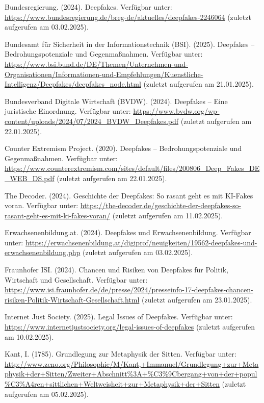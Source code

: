 \documentclass[a4paper,12pt]{article}
\begin{document}
\begin{thebibliography}{99}
 Bundesregierung. (2024). Deepfakes. 
Verfügbar unter: \url{https://www.bundesregierung.de/breg-de/aktuelles/deepfakes-2246064} (zuletzt aufgerufen am 03.02.2025).

 Bundesamt für Sicherheit in der Informationstechnik (BSI). (2025). Deepfakes – Bedrohungspotenziale und Gegenmaßnahmen. 
Verfügbar unter: \url{https://www.bsi.bund.de/DE/Themen/Unternehmen-und-Organisationen/Informationen-und-Empfehlungen/Kuenstliche-Intelligenz/Deepfakes/deepfakes_node.html} (zuletzt aufgerufen am 21.01.2025).

 Bundesverband Digitale Wirtschaft (BVDW). (2024). Deepfakes – Eine juristische Einordnung. 
Verfügbar unter: \url{https://www.bvdw.org/wp-content/uploads/2024/07/2024_BVDW_Deepfakes.pdf} (zuletzt aufgerufen am 22.01.2025).

 Counter Extremism Project. (2020). Deepfakes – Bedrohungspotenziale und Gegenmaßnahmen.
Verfügbar unter: \url{https://www.counterextremism.com/sites/default/files/200806_Deep_Fakes_DE_WEB_DS.pdf} (zuletzt aufgerufen am 22.01.2025).

 The Decoder. (2024). Geschichte der Deepfakes: So rasant geht es mit KI-Fakes voran.
Verfügbar unter: \url{https://the-decoder.de/geschichte-der-deepfakes-so-rasant-geht-es-mit-ki-fakes-voran/} (zuletzt aufgerufen am 11.02.2025).

 Erwachsenenbildung.at. (2024). Deepfakes und Erwachsenenbildung. 
Verfügbar unter: \url{https://erwachsenenbildung.at/digiprof/neuigkeiten/19562-deepfakes-und-erwachsenenbildung.php} (zuletzt aufgerufen am 03.02.2025).

 Fraunhofer ISI. (2024). Chancen und Risiken von Deepfakes für Politik, Wirtschaft und Gesellschaft. 
Verfügbar unter: \url{https://www.isi.fraunhofer.de/de/presse/2024/presseinfo-17-deepfakes-chancen-risiken-Politik-Wirtschaft-Gesellschaft.html} (zuletzt aufgerufen am 23.01.2025).

 Internet Just Society. (2025). Legal Issues of Deepfakes.
Verfügbar unter: \url{https://www.internetjustsociety.org/legal-issues-of-deepfakes} (zuletzt aufgerufen am 10.02.2025).

 Kant, I. (1785). Grundlegung zur Metaphysik der Sitten.  
Verfügbar unter: \url{http://www.zeno.org/Philosophie/M/Kant,+Immanuel/Grundlegung+zur+Metaphysik+der+Sitten/Zweiter+Abschnitt%3A+%C3%9Cbergang+von+der+popul%C3%A4ren+sittlichen+Weltweisheit+zur+Metaphysik+der+Sitten} (zuletzt aufgerufen am 05.02.2025).


\end{thebibliography}
\end{document}
